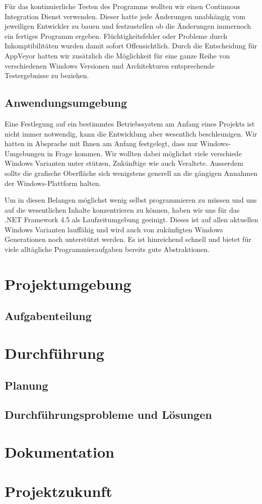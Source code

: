 \documentclass[12pt]{article}
\begin{document}
Für das kontinuierliche Testen des Programms wollten wir einen Continuous Integration Dienst verwenden. Dieser hatte jede Änderungen unabhängig vom jeweiligen Entwickler zu bauen und festzustellen ob die Änderungen immernoch ein fertiges Programm ergeben. Flüchtigkeitsfehler oder Probleme durch Inkomptibilitäten wurden damit sofort Offensichtlich. Durch die Entscheidung für AppVeyor hatten wir zusätzlich die Möglichkeit für eine ganze Reihe von verschiedenen Windows Versionen und Architekturen entsprechende Testergebnisse zu beziehen.

\subsection{Anwendungsumgebung}

Eine Festlegung auf ein bestimmtes Betriebssystem am Anfang eines Projekts ist nicht immer notwendig, kann die Entwicklung aber wesentlich beschleunigen. Wir hatten in Absprache mit Ihnen am Anfang festgelegt, dass nur Windows-Umgebungen in Frage kommen. Wir wollten dabei möglichst viele verschiede Windows Varianten unter stützen, Zukünftige wie auch Veraltete. Ausserdem sollte die grafische Oberfläche sich wenigstens generell an die gängigen Annahmen der Windows-Plattform halten.

Um in diesen Belangen möglichst wenig selbst programmieren zu müssen und uns auf die wesentlichen Inhalte konzentrieren zu können, haben wir uns für das .NET Framework 4.5 als Laufzeitumgebung geeinigt. Dieses ist auf allen aktuellen Windows Varianten lauffähig und wird auch von zukünfigten Windows Generationen noch unterstützt werden. Es ist hinreichend schnell und bietet für viele alltägliche Programmieraufgaben bereits gute Abstraktionen.

\newpage
\section{Projektumgebung}
\subsection{Aufgabenteilung}

\newpage
\section{Durchführung}
\subsection{Planung}
\subsection{Durchführungsprobleme und Lösungen}

\newpage
\section{Dokumentation}

\newpage
\section{Projektzukunft}
\end{document}
